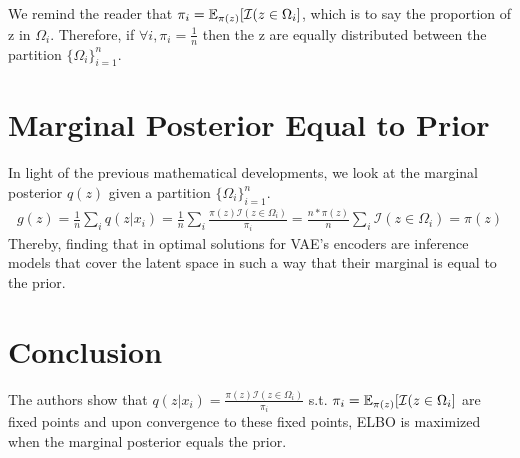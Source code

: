 We remind the reader that $\pi_{i} = \operatorname{\mathbb{E}}_{\pi(z)}[\mathcal{I}(z\in\Omega_{i}]$, which is to say the proportion of z in $\Omega_i$. Therefore, if $\forall i, \pi_i = \frac{1}{n}$ then the z are equally distributed between the partition $\lbrace{{\Omega_i}\rbrace}_{i=1}^n$.

\section*{Marginal Posterior Equal to Prior}
In light of the previous mathematical developments, we look at the marginal posterior $q(z)$ given a partition $\lbrace{{\Omega_i}\rbrace}_{i=1}^n$.
\begin{gather*}
g(z) = \frac{1}{n}\sum_i q(z|x_i) = \frac{1}{n}\sum_i \frac{\pi(z)\mathcal{I}(z\in\Omega_i)}{\pi_i} = \frac{n * \pi(z)}{n} \sum_i \mathcal{I}(z\in\Omega_i)= \pi(z)
\end{gather*}
Thereby, finding that in optimal solutions for VAE's encoders are inference models that cover the latent space in such a way that their marginal is equal to the prior.

\section*{Conclusion}
The authors show that $q(z|x_{i}) = \frac{\pi(z)\mathcal{I}({z\in\Omega_{i}})}{\pi_{i}}$ s.t. $\pi_{i} = \operatorname{\mathbb{E}}_{\pi(z)}[\mathcal{I}(z\in\Omega_{i}]$ are fixed points and upon convergence to these fixed points, ELBO is maximized when the marginal posterior equals the prior.





